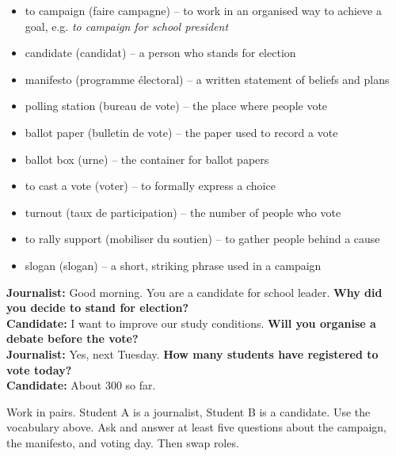 \documentclass[11pt]{article}
\newcommand{\cle}[1]{{\popxbold\color{popdark}#1}}
\begin{document}
\begin{definition}
\begin{itemize}
\item \cle{to campaign} (faire campagne) -- to work in an organised way to achieve a goal, e.g. \emph{to campaign for school president}
\item \cle{candidate} (candidat) -- a person who stands for election
\item \cle{manifesto} (programme électoral) -- a written statement of beliefs and plans
\item \cle{polling station} (bureau de vote) -- the place where people vote
\item \cle{ballot paper} (bulletin de vote) -- the paper used to record a vote
\item \cle{ballot box} (urne) -- the container for ballot papers
\item \cle{to cast a vote} (voter) -- to formally express a choice
\item \cle{turnout} (taux de participation) -- the number of people who vote
\item \cle{to rally support} (mobiliser du soutien) -- to gather people behind a cause
\item \cle{slogan} (slogan) -- a short, striking phrase used in a campaign
\end{itemize}
\end{definition}

\begin{exemplebox}
\textbf{Journalist:} Good morning. You are a candidate for school leader. \textbf{Why did you decide to stand for election?} \\
\textbf{Candidate:} I want to improve our study conditions. \textbf{Will you organise a debate before the vote?} \\
\textbf{Journalist:} Yes, next Tuesday. \textbf{How many students have registered to vote today?} \\
\textbf{Candidate:} About 300 so far.
\end{exemplebox}

\begin{exercice}
Work in pairs. Student A is a journalist, Student B is a candidate. Use the vocabulary above. Ask and answer at least five questions about the campaign, the manifesto, and voting day. Then swap roles.
\end{exercice}
\end{document}
